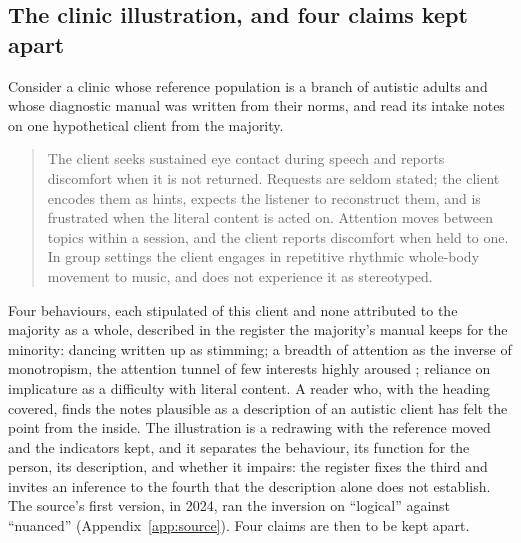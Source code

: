 \subsection{The clinic illustration, and four claims kept apart}
\label{sec:redrawing}

Consider a clinic whose reference population is a branch of autistic adults and whose diagnostic manual was written from their norms, and read its intake notes on one hypothetical client from the majority.
\begin{quote}
The client seeks sustained eye contact during speech and reports discomfort when it is not returned. Requests are seldom stated; the client encodes them as hints, expects the listener to reconstruct them, and is frustrated when the literal content is acted on. Attention moves between topics within a session, and the client reports discomfort when held to one. In group settings the client engages in repetitive rhythmic whole-body movement to music, and does not experience it as stereotyped.
\end{quote}
Four behaviours, each stipulated of this client and none attributed to the majority as a whole, described in the register the majority's manual keeps for the minority: dancing written up as stimming; a breadth of attention as the inverse of monotropism, the attention tunnel of few interests highly aroused \cite{Murray2005}; reliance on implicature as a difficulty with literal content. A reader who, with the heading covered, finds the notes plausible as a description of an autistic client has felt the point from the inside. The illustration is a redrawing with the reference moved and the indicators kept, and it separates the behaviour, its function for the person, its description, and whether it impairs: the register fixes the third and invites an inference to the fourth that the description alone does not establish. The source's first version, in 2024, ran the inversion on ``logical'' against ``nuanced'' (Appendix~\ref{app:source}). Four claims are then to be kept apart.
